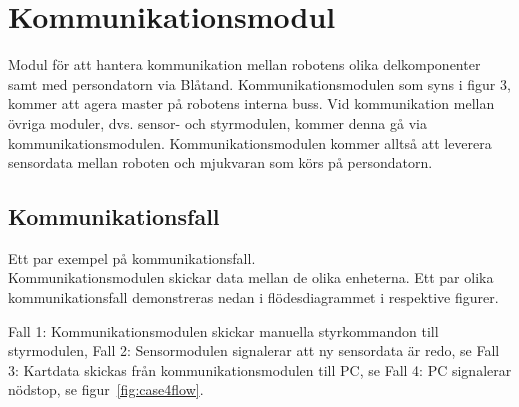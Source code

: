 \documentclass[a4paper,12pt,fleqn]{article}
\begin{document}
\addto\captionsswedish{\renewcommand{\contentsname}{Innehållsförteckning}}

\tableofcontents
\thispagestyle{fancy}
\newpage



\section{Kommunikationsmodul}
Modul för att hantera kommunikation mellan robotens olika delkomponenter samt med persondatorn via Blåtand. Kommunikationsmodulen som syns i figur 3, kommer att agera master på robotens interna buss. Vid kommunikation mellan övriga moduler, dvs. sensor- och styrmodulen, kommer denna gå via kommunikationsmodulen.
Kommunikationsmodulen kommer alltså att leverera sensordata mellan roboten och mjukvaran som körs på persondatorn.

\subsection{Kommunikationsfall}
Ett par exempel på kommunikationsfall. \\

Kommunikationsmodulen skickar data mellan de olika enheterna. Ett par olika kommunikationsfall demonstreras nedan i flödesdiagrammet i respektive figurer.

Fall 1: Kommunikationsmodulen skickar manuella styrkommandon till styrmodulen,%
Fall 2: Sensormodulen signalerar att ny sensordata är redo, se %
Fall 3: Kartdata skickas från kommunikationsmodulen till PC, se %
Fall 4: PC signalerar nödstop, se figur~\ref{fig:case4flow}. \\
\end{document}
